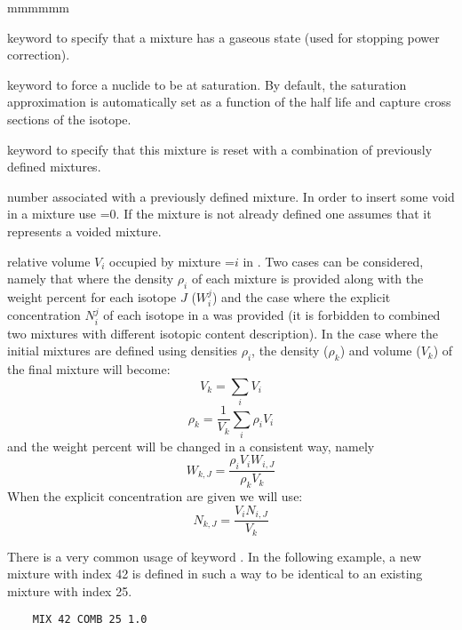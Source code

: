 \begin{ListeDeDescription}{mmmmmm}
\item[\moc{GAS}] keyword to specify that a mixture has a gaseous state (used for stopping power correction).

\item[\moc{SAT}] keyword to force a nuclide to be at saturation. By default, the saturation approximation is
automatically set as a function of the half life and capture cross sections of the isotope.

\item[\moc{COMB}]  keyword to specify that this mixture is reset with a
combination of previously defined mixtures.

\item[\dusa{mati}]  number associated with a previously defined mixture. In
order to insert some void in a mixture use =0. If the mixture is not
already defined one assumes that it represents a voided mixture.

\item[\dusa{relvol}] relative volume $V_{i}$ occupied by mixture
=$i$ in .  Two cases can be considered, namely that
where the density $\rho_{i}$ of each mixture  is provided along with
the weight percent for each isotope $J$ ($W_{i}^{j}$) and the case where the
explicit concentration $N_{i}^{j}$ of each isotope in a  was provided
(it is forbidden to combined two mixtures with different isotopic content
description). In the case where the initial mixtures are defined using densities
$\rho_{i}$, the density ($\rho_k$) and volume ($V_{k}$) of the final mixture
will become:
  $$V_{k}=\sum_{i} V_{i} $$
  $$\rho_{k}=\frac{1}{V_{k}} \sum_{i}\rho_{i}V_{i}$$
and the weight percent will be changed in a consistent way, namely
  $$W_{k,J}=\frac{\rho_{i}V_{i}W_{i,J}}{\rho_{k} V_{k} } $$
When the explicit concentration are given we will use:
  $$N_{k,J}=\frac{V_{i}N_{i,J}}{V_{k} } $$

\vskip 0.08cm

There is a very common usage of keyword . In the following example, a new mixture with index 42
is defined in such a way to be identical to an existing mixture with index 25. 
\begin{verbatim}
    MIX 42 COMB 25 1.0
\end{verbatim}

\end{ListeDeDescription}

